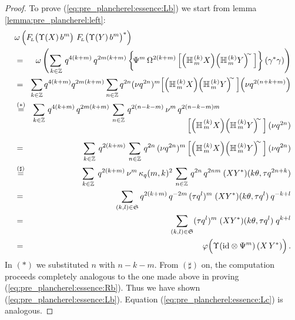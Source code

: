 \begin{proof}
To prove (\ref{eq:pre_plancherel:essence:Lb}) we start from
lemma \ref{lemma:pre_plancherel:left}:
\begin{eqnarray*}
\lefteqn{ \omega \left(\vertL
     \FLabb\! \left(\Upsilon(X)\, b^m \vertM\right) \,
     \FLabb\! \left(\Upsilon(Y)\, b^m \vertM\right)^*   \right)  }\\
&=&\!\!
    \omega \left( \sum_{\,k \in\ZZ}  \, q^{4(k+m)} \, q^{2m(k+m)}
    \left\{ \! \Psi^m \, \Omega^{2(k+m)}
    \left[ \left(\YaH{m}{k}X\right) \! \left(\YaH{m}{k}Y\right)^{\!\!\sim}\,
    \right] \vertXL \! \right\} (\gamma^*\gamma) \right)
\\&=&\!\!
    \sum_{k \in\ZZ}   q^{4(k+m)}  q^{2m(k+m)}
    \sum_{n\in\ZZ}  q^{2n}  (\nu q^{2n})^m \!
    \left[ \left(\YaH{m}{k}X\right) \! \left(\YaH{m}{k}Y\right)^{\!\!\sim}\,
    \right] \! \left(\nu q^{2(n+k+m)}\right)
\\
&\stackrel{(*)}{=}&\!\!
    \sum_{k\in\ZZ} \, q^{4(k+m)} \, q^{2m(k+m)} \,
    \sum_{n\in\ZZ} \, q^{2(n-k-m)} \, \nu^m \, q^{2(n-k-m)m}
 \hspace{-4em}\raisebox{-4.5ex}{$
    \left[ \left(\YaH{m}{k}X\right) \! \left(\YaH{m}{k}Y\right)^{\!\!\sim}\,
    \right] (\nu q^{2n})  $}
\\&=&\!\!\vertXXL
    \sum_{k \in\ZZ} \: q^{2(k+m)} \,
    \sum_{n\in\ZZ} \, q^{2n} \, (\nu q^{2n})^m
    \left[ \left(\YaH{m}{k}X\right) \! \left(\YaH{m}{k}Y\right)^{\!\!\sim}\,
    \right]  (\nu q^{2n})
\\
&\stackrel{(\sharp)}{=}&\!\!
    \sum_{k\in\ZZ} \; q^{2(k+m)} \, \nu^m \, \kq(m,k)^2 \,
    \sum_{n\in\ZZ} \,  q^{2n} \, q^{2nm} \:  (X Y^*)(k\theta, \tau q^{2n+k})
\\&=&\!\!
    \sum_{(k,l)\in\mathfrak{S}} q^{2(k+m)} \,  q^{-2m} \, (\tau q^l)^m \;
    (X Y^*)(k\theta, \tau q^l) \: q^{-k+l}
\\&=&\!\!
    \sum_{(k,l)\in\mathfrak{S}} (\tau q^l)^m \;
          (X Y^*)(k\theta, \tau q^l) \; q^{k+l}
\\&=&\!\!
    \varphi \! \left(\Upsilon \!\left(\id \tens \Psi^m \right)(X \, Y^*) \vertL\right).
\end{eqnarray*}
In $(*)$ we substituted $n$ with $n-k-m$. From $(\sharp)$ on, the computation
proceeds completely analogous to the one made above in proving
(\ref{eq:pre_plancherel:essence:Rb}).
Thus we have shown (\ref{eq:pre_plancherel:essence:Lb}).
Equation (\ref{eq:pre_plancherel:essence:Lc}) is analogous.
\end{proof}



